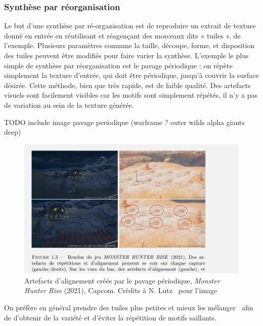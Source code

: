 \subsubsection{Synthèse par réorganisation}

Le but d'une synthèse par ré-organisation est de reproduire un extrait de texture donné en entrée en réutilisant et réagençant des morceaux dits « tuiles », de l'exemple. Plusieurs paramètres commme la taille, découpe, forme, et disposition des tuiles peuvent être modifiés pour faire varier la synthèse. L'exemple le plus simple de synthèse par réorganisation est le pavage périodique : on répète simplement la texture d'entrée, qui doit être périodique, jusqu'à couvrir la surface désirée. Cette méthode, bien que très rapide, est de faible qualité. Des artefacts visuels sont facilement visibles car les motifs sont simplement répétés, il n'y a pas de variation au sein de la texture générée.

{\color{red}TODO include image pavage periodique (warframe ? outer wilds alpha giants deep)}

\bigskip

\begin{figure}
    \centering
    \includegraphics[width=\textwidth]{contenu/resources/images/periodic_tiling}
    \caption[Artefacts d'alignement créés par le pavage périodique]{Artefacts d'alignement créés par le pavage périodique, \textit{Monster Hunter Rise} (2021), Capcom. Crédits à N. Lutz~\cite{lutz_processus_2021} pour l'image}
    \label{fig:pavage_periodique}
\end{figure}

On préfère en général prendre des tuiles plus petites et mieux les mélanger~\cite{heitz_high-performance_2018} afin de d'obtenir de la variété et d'éviter la répétition de motifs saillants. 


